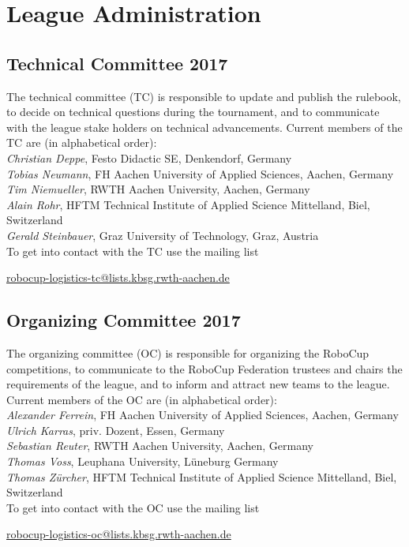 \documentclass[12pt,twoside]{article}
\begin{document}

\section{League Administration} \label{sec:commitees}
\subsection{Technical Committee 2017}
\label{sec:tc}
The technical committee (TC) is responsible to update and publish the
rulebook, to decide on technical questions during the tournament, and
to communicate with the league stake holders on technical
advancements. Current members of the TC are (in alphabetical order):\\[.5em]
\emph{Christian Deppe}, Festo Didactic SE, Denkendorf, Germany\\
\emph{Tobias Neumann}, FH Aachen University of Applied Sciences,
Aachen, Germany\\
\emph{Tim Niemueller}, RWTH Aachen University, Aachen, Germany\\
\emph{Alain Rohr}, HFTM Technical Institute of Applied Science Mittelland, Biel, Switzerland\\
\emph{Gerald Steinbauer}, Graz University of Technology, Graz, Austria\\[.5em]
To get into contact with the TC use the mailing list\\
\centerline{\url{robocup-logistics-tc@lists.kbsg.rwth-aachen.de}}

\subsection{Organizing Committee 2017}
\label{sec:oc}
The organizing committee (OC) is responsible for organizing the
RoboCup competitions, to communicate to the RoboCup Federation
trustees and chairs the requirements of the league, and to inform and
attract new teams to the league. Current members of the OC are (in
alphabetical order):\\[.5em]
\emph{Alexander Ferrein}, FH Aachen University of Applied Sciences, Aachen, Germany\\
\emph{Ulrich Karras}, priv. Dozent, Essen, Germany\\
\emph{Sebastian Reuter}, RWTH Aachen University, Aachen, Germany\\
\emph{Thomas Voss}, Leuphana University, Lüneburg Germany\\
\emph{Thomas Zürcher}, HFTM Technical Institute of Applied Science Mittelland, Biel, Switzerland\\[.5em]
To get into contact with the OC use the mailing list\\
\centerline{\url{robocup-logistics-oc@lists.kbsg.rwth-aachen.de}}
\end{document}
